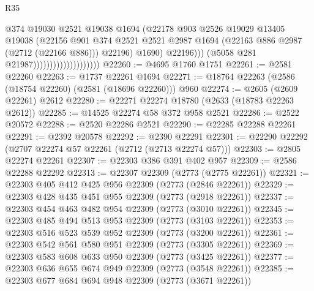 \begin{lexlean}{R35}
\begin{coremodule}
                                                @374
                                                @19030
                                                @2521
                                                @19038
                                                @1694
                                                (@22178
                                                  @903
                                                  @2526
                                                  @19029
                                                  @13405
                                                  @19038
                                                  (@22156
                                                    @901
                                                    @374
                                                    @2521
                                                    @2521
                                                    @2987
                                                    @1694
                                                    (@22163 @886 @2987 (@2712 (@22166 @886)))
                                                    @22196)
                                                  @1690)
                                                @22196)))
                                          (@5058 @281 @21987))))))))))))))))))))
@22260 := @4695 @1760 @1751
@22261 := @2581 @22260
@22263 := @1737 @22261 @1694
@22271 := @18764 @22263 (@2586 (@18754 @22260) (@2581 (@18696 @22260))) @960
@22274 := @2605 (@2609 @22261) @2612
@22280 := @22271 @22274 @18780 (@2633 (@18783 @22263 @2612))
@22285 := @14525 @22274 @58 @372 @958 @2521
@22286 := @2522 @20572
@22288 := @2520 @22286 @2521
@22290 := @22285 @22288 @22261
@22291 := @2392 @20578
@22292 := @2390 @22291
@22301 := @22290 @22292 (@2707 @22274 @57 @22261 (@2712 (@2713 @22274 @57)))
@22303 := @2805 @22274 @22261
@22307 := @22303 @386 @391 @402 @957
@22309 := @2586 @22288 @22292
@22313 := @22307 @22309 (@2773 (@2775 @22261))
@22321 := @22303 @405 @412 @425 @956 @22309 (@2773 (@2846 @22261))
@22329 := @22303 @428 @435 @451 @955 @22309 (@2773 (@2918 @22261))
@22337 := @22303 @454 @463 @482 @954 @22309 (@2773 (@3010 @22261))
@22345 := @22303 @485 @494 @513 @953 @22309 (@2773 (@3103 @22261))
@22353 := @22303 @516 @523 @539 @952 @22309 (@2773 (@3200 @22261))
@22361 := @22303 @542 @561 @580 @951 @22309 (@2773 (@3305 @22261))
@22369 := @22303 @583 @608 @633 @950 @22309 (@2773 (@3425 @22261))
@22377 := @22303 @636 @655 @674 @949 @22309 (@2773 (@3548 @22261))
@22385 := @22303 @677 @684 @694 @948 @22309 (@2773 (@3671 @22261))

\end{coremodule}
\end{lexlean}
